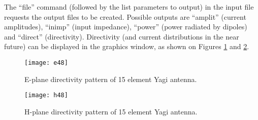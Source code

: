 \documentclass{article}
\begin{document}
The ``file'' command (followed by the list parameters to output) in
the input file requests the output files to be created. Possible
outputs are ``amplit'' (current amplitudes), ``inimp'' (input
impedance), ``power'' (power radiated by dipoles) and ``direct''
(directivity). Directivity (and current distributions in the near
future) can be displayed in the graphics window, as shown on Figures
\ref{fig:e48} and \ref{fig:h48}.

\begin{figure}
  \texttt{[image: e48]}
  \caption{\label{fig:e48}E-plane directivity pattern of 15 element
    Yagi antenna.}
\end{figure}

\begin{figure}
  \texttt{[image: h48]}
  \caption{\label{fig:h48}H-plane directivity pattern of 15 element
    Yagi antenna.}
\end{figure}
\end{document}
